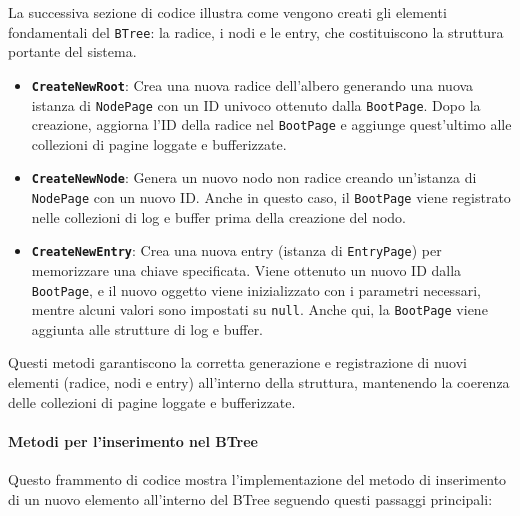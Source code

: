 \documentclass[12pt,a4paper,openright,twoside]{book}
\begin{document}
                    La successiva sezione di codice illustra come vengono creati gli elementi fondamentali del \texttt{BTree}: la radice, i nodi e le entry, che costituiscono la struttura portante del sistema.

                    \begin{itemize}
                        \item \textbf{\texttt{CreateNewRoot}}: Crea una nuova radice dell'albero generando una nuova istanza di \texttt{NodePage} con un ID univoco ottenuto dalla \texttt{BootPage}.
                        Dopo la creazione, aggiorna l'ID della radice nel \texttt{BootPage} e aggiunge quest'ultimo alle collezioni di pagine loggate e bufferizzate.
                        \item \textbf{\texttt{CreateNewNode}}: Genera un nuovo nodo non radice creando un'istanza di \texttt{NodePage} con un nuovo ID.
                        Anche in questo caso, il \texttt{BootPage} viene registrato nelle collezioni di log e buffer prima della creazione del nodo.
                        \item \textbf{\texttt{CreateNewEntry}}: Crea una nuova entry (istanza di \texttt{EntryPage}) per memorizzare una chiave specificata.
                        Viene ottenuto un nuovo ID dalla \texttt{BootPage}, e il nuovo oggetto viene inizializzato con i parametri necessari, mentre alcuni valori sono impostati su \texttt{null}.
                        Anche qui, la \texttt{BootPage} viene aggiunta alle strutture di log e buffer.
                    \end{itemize}

                    Questi metodi garantiscono la corretta generazione e registrazione di nuovi elementi (radice, nodi e entry) all'interno della struttura, mantenendo la coerenza delle collezioni di pagine loggate e bufferizzate.

                    

                    \clearpage

                \paragraph{Metodi per l'inserimento nel BTree}

                    Questo frammento di codice mostra l'implementazione del metodo di inserimento di un nuovo elemento all'interno del BTree seguendo questi passaggi principali:
\end{document}
